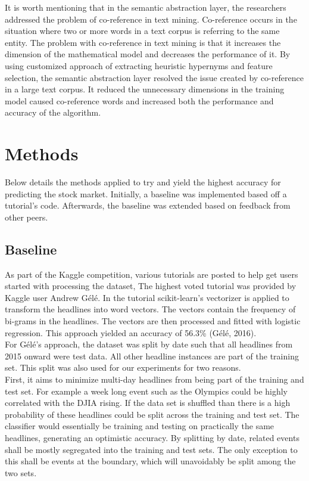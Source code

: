 \documentclass[11pt,a4paper]{article}
\begin{document}
It is worth mentioning that in the semantic abstraction layer, the researchers addressed the problem of co-reference in text mining. Co-reference occurs in the situation where two or more words in a text corpus is referring to the same entity. The problem with co-reference in text mining is that it increases the dimension of the mathematical model and decreases the performance of it. By using customized approach of extracting heuristic hypernyms and feature selection, the semantic abstraction layer resolved the issue created by co-reference in a large text corpus. It reduced the unnecessary dimensions in the training model caused co-reference words and increased both the performance and accuracy of the algorithm.\\


\section{Methods}
Below details the methods applied to try and yield the highest accuracy for predicting the stock market. Initially, a baseline was implemented based off a tutorial's code. Afterwards, the baseline was extended based on feedback from other peers.\\

\subsection{Baseline}
As part of the Kaggle competition, various tutorials are posted to help get users started with processing the dataset, The highest voted tutorial was provided by Kaggle user Andrew G\'el\'e. In the tutorial scikit-learn’s vectorizer is applied to transform the headlines into word vectors. The vectors contain the frequency of bi-grams in the headlines. The vectors are then processed and fitted with logistic regression. This approach yielded an accuracy of 56.3\% (G\'el\'e, 2016).\\

For G\'el\'e’s approach, the dataset was split by date such that all headlines from 2015 onward were test data. All other headline instances are part of the training set. This split was also used for our experiments for two reasons.\\

First, it aims to minimize multi-day headlines from being part of the training and test set. For example a week long event such as the Olympics could be highly correlated with the DJIA rising. If the data set is shuffled than there is a high probability of these headlines could be split across the training and test set. The classifier would essentially be training and testing on practically the same headlines, generating an optimistic accuracy. By splitting by date, related events shall be mostly segregated into the training and test sets. The only exception to this shall be events at the boundary, which will unavoidably be split among the two sets.\\
\end{document}
